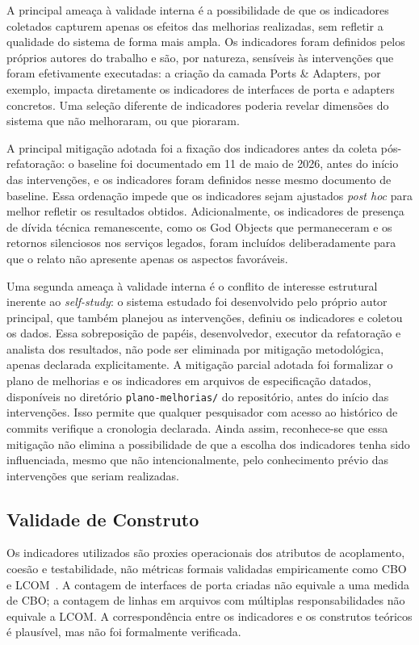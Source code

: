 \documentclass[sigconf,anonymous]{acmart}
\begin{document}
A principal ameaça à validade interna é a possibilidade de que os indicadores coletados capturem apenas os efeitos das melhorias realizadas, sem refletir a qualidade do sistema de forma mais ampla. Os indicadores foram definidos pelos próprios autores do trabalho e são, por natureza, sensíveis às intervenções que foram efetivamente executadas: a criação da camada Ports \& Adapters, por exemplo, impacta diretamente os indicadores de interfaces de porta e adapters concretos. Uma seleção diferente de indicadores poderia revelar dimensões do sistema que não melhoraram, ou que pioraram.

A principal mitigação adotada foi a fixação dos indicadores antes da coleta pós-refatoração: o baseline foi documentado em 11 de maio de 2026, antes do início das intervenções, e os indicadores foram definidos nesse mesmo documento de baseline. Essa ordenação impede que os indicadores sejam ajustados \textit{post hoc} para melhor refletir os resultados obtidos. Adicionalmente, os indicadores de presença de dívida técnica remanescente, como os God Objects que permaneceram e os retornos silenciosos nos serviços legados, foram incluídos deliberadamente para que o relato não apresente apenas os aspectos favoráveis.

Uma segunda ameaça à validade interna é o conflito de interesse estrutural inerente ao \textit{self-study}: o sistema estudado foi desenvolvido pelo próprio autor principal, que também planejou as intervenções, definiu os indicadores e coletou os dados. Essa sobreposição de papéis, desenvolvedor, executor da refatoração e analista dos resultados, não pode ser eliminada por mitigação metodológica, apenas declarada explicitamente. A mitigação parcial adotada foi formalizar o plano de melhorias e os indicadores em arquivos de especificação datados, disponíveis no diretório \texttt{plano-melhorias/} do repositório, antes do início das intervenções. Isso permite que qualquer pesquisador com acesso ao histórico de commits verifique a cronologia declarada. Ainda assim, reconhece-se que essa mitigação não elimina a possibilidade de que a escolha dos indicadores tenha sido influenciada, mesmo que não intencionalmente, pelo conhecimento prévio das intervenções que seriam realizadas.

\subsection{Validade de Construto}

Os indicadores utilizados são proxies operacionais dos atributos de acoplamento, coesão e testabilidade, não métricas formais validadas empiricamente como CBO e LCOM~\cite{Chidamber1994}. A contagem de interfaces de porta criadas não equivale a uma medida de CBO; a contagem de linhas em arquivos com múltiplas responsabilidades não equivale a LCOM. A correspondência entre os indicadores e os construtos teóricos é plausível, mas não foi formalmente verificada.
\end{document}
